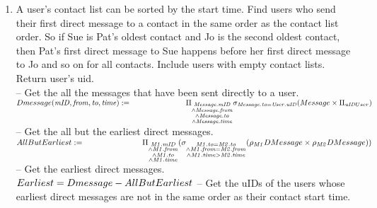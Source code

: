 \documentclass{article}
\newcommand{\var}[1]{\mathit{#1}}
\begin{document}
\begin{enumerate}
\item   %
A user’s contact list can be sorted by the start time. Find users who send their first direct message to a contact in the same order as the contact list order. So if Sue is Pat’s oldest contact and Jo is the second oldest contact, then Pat’s first direct message to Sue happens before her first direct message to Jo and so on for all contacts. Include users with empty contact lists. Return user’s uid. \\ [5pt]
\large{
\hspace*{1cm} -- Get the all the messages that have been sent directly to a user. \\ [5pt]
$
Dmessage(\var{mID}, \var{from}, \var{to}, \var{time}) := \\
	\hspace*{1in}
	\Pi_{\substack{\var{Message.mID} \\
		\wedge \var{Message.from} \\
		\wedge \var{Message.to} \\
		\wedge \var{Message.time}}} 
	\sigma_{\var{Message.to} = \var{User.uID}}
	(Message \times \Pi_{\var{uID} User}) \\\\
$
\hspace*{1cm} -- Get the all but the earliest direct messages. \\ [5pt]
$
AllButEarliest := \\
	\hspace*{1in}
	\Pi_{\substack{\var{M1.mID} \\
		\wedge \var{M1.from} \\
		\wedge \var{M1.to} \\
		\wedge \var{M1.time}}} 
	(\sigma_{\substack{\var{M1.to} = \var{M2.to} \\
		\wedge \var{M1.from} = \var{M2.from} \\
		\wedge \var{M1.time} > \var{M2.time}}}
	(\rho_{\var{M1}} DMessage \times \rho_{\var{M2}} DMessage)) \\\\
$
\hspace*{1cm} -- Get the earliest direct messages. \\ [5pt] 
$
Earliest = Dmessage - AllButEarliest \\\\
$
\hspace*{1cm} -- Get the uIDs of the users whose earliest direct messages are not in the same order as their contact start time. \\ [5pt]
}
\end{enumerate}
\end{document}
